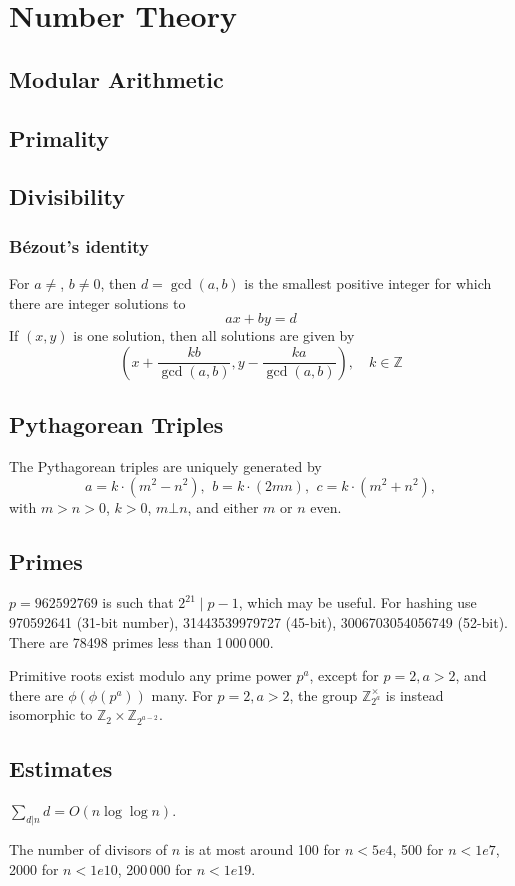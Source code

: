 \chapter{Number Theory}

\section{Modular Arithmetic}

\section{Primality}

\section{Divisibility}
	
	\subsection{Bézout's identity}
	For $a \neq $, $b \neq 0$, then $d=\gcd(a,b)$ is the smallest positive integer for which there are integer solutions to
	$$ax+by=d$$
	If $(x,y)$ is one solution, then all solutions are given by
	$$\left(x+\frac{kb}{\gcd(a,b)}, y-\frac{ka}{\gcd(a,b)}\right), \quad k\in\mathbb{Z}$$


\section{Pythagorean Triples}
	 The Pythagorean triples are uniquely generated by
	 \[ a=k\cdot (m^{2}-n^{2}),\ \,b=k\cdot (2mn),\ \,c=k\cdot (m^{2}+n^{2}), \]
	 with $m > n > 0$, $k > 0$, $m \bot n$, and either $m$ or $n$ even.

\section{Primes}
	$p=962592769$ is such that $2^{21} \mid p-1$, which may be useful. For hashing
	use 970592641 (31-bit number), 31443539979727 (45-bit), 3006703054056749
	(52-bit). There are 78498 primes less than 1\,000\,000.

	Primitive roots exist modulo any prime power $p^a$, except for $p = 2, a > 2$, and there are $\phi(\phi(p^a))$ many.
	For $p = 2, a > 2$, the group $\mathbb Z_{2^a}^\times$ is instead isomorphic to $\mathbb Z_2 \times \mathbb Z_{2^{a-2}}$.

\section{Estimates}
	$\sum_{d|n} d = O(n \log \log n)$.

	The number of divisors of $n$ is at most around 100 for $n < 5e4$, 500 for $n < 1e7$, 2000 for $n < 1e10$, 200\,000 for $n < 1e19$.
